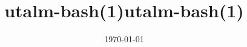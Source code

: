 \documentclass{article}
\title{utalm-bash(1)}
\date{\today}
\title{\textbf{utalm-bash(1)}}
\begin{document}
\maketitle
\extpdfcontent
 
\newpage
\end{document}

